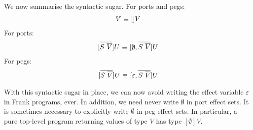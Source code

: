 \documentclass[preprint]{sigplanconf}
\makeatletter
\newcommand{\many}{\overline}
\newcommand\ba{\begin{array}}
\newcommand\ea{\end{array}}
\newenvironment{equations}{\[\ba{@{}r@{~}c@{~}l@{}}}{\ea\]}
\newcommand{\effbox}[1]{[#1]}
\newcommand{\force}[1]{{#1}!}
\makeatother
\begin{document}
We now summarise the syntactic sugar. For ports and pegs:
\begin{equations}
V &\equiv& \effbox{}V \\
\end{equations}
For ports:
\begin{equations}
\effbox{\many{S~\many{V}}}U &\equiv& \effbox{\emptyset, \many{S~\many{V}}}U \\
\end{equations}
For pegs:
\begin{equations}
\effbox{\many{S~\many{V}}}U &\equiv& \effbox{\varepsilon, \many{S~\many{V}}}U \\
\end{equations}

With this syntactic sugar in place, we can now avoid writing the
effect variable $\varepsilon$ in Frank programs, ever. In addition, we
need never write $\emptyset$ in port effect sets. It is sometimes
necessary to explicitly write $\emptyset$ in peg effect sets. In
particular, a pure top-level program returning values of type $V$ has
type $\effbox{\emptyset}V$.













\end{document}
